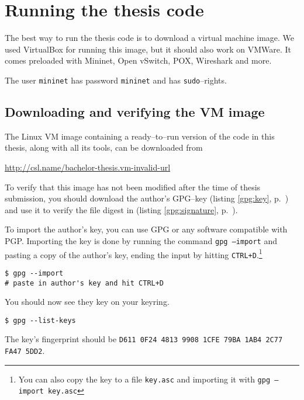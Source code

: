 \chapter{Running the thesis code}

The best way to run the thesis code is to download a virtual machine image.
We used VirtualBox for running this image, but it should
also work on VMWare.  It comes preloaded with
Mininet, Open vSwitch, POX,
  Wireshark and more.

The user \texttt{mininet} has password \texttt{mininet} and has
\texttt{sudo}--rights.

\section{Downloading and verifying the VM image}

The Linux VM image containing a ready--to--run version of the
code in this thesis, along with all its tools, can be downloaded from
%
\begin{center}
  \href{http://csl.name/bachelor-thesis.vm-invalid-url}{http://csl.name/bachelor-thesis.vm-invalid-url}
  \label{gpg:url}
\end{center}

To verify that this image has not been modified after the time of thesis
submission, you should download the author's GPG--key (listing
\ref{gpg:key}, p.~\pageref{gpg:key}) and use it to verify the file digest
in (listing \ref{gpg:signature}, p.~\pageref{gpg:signature}).

To import the author's key, you can use \ac{GPG} or any software compatible
with PGP.  Importing the key is done by running the command
\texttt{gpg --import} and pasting a copy of the author's key, ending the
input by hitting \texttt{CTRL+D}.\footnote{You can also copy the key to a
  file \texttt{key.asc} and importing it with \texttt{gpg --import key.asc}}

\begin{Verbatim}
$ gpg --import
# paste in author's key and hit CTRL+D
\end{Verbatim}

You should now see they key on your keyring.

\begin{Verbatim}
$ gpg --list-keys
\end{Verbatim}

The key's fingerprint should be \texttt{D611 0F24 4813 9908 1CFE  79BA 1AB4
  2C77 FA47 5DD2}.

